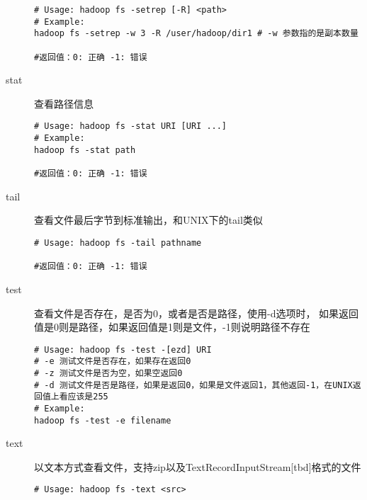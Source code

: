 \documentclass{article}
\begin{document}
\begin{description}
\begin{verbatim}
# Usage: hadoop fs -setrep [-R] <path>
# Example:
hadoop fs -setrep -w 3 -R /user/hadoop/dir1 # -w 参数指的是副本数量

#返回值：0: 正确 -1: 错误
\end{verbatim}

\item[stat] 查看路径信息

\begin{verbatim}
# Usage: hadoop fs -stat URI [URI ...]
# Example:
hadoop fs -stat path

#返回值：0: 正确 -1: 错误
\end{verbatim}

\item[tail] 查看文件最后字节到标准输出，和UNIX下的tail类似

\begin{verbatim}
# Usage: hadoop fs -tail pathname

#返回值：0: 正确 -1: 错误
\end{verbatim}

\item[test] 查看文件是否存在，是否为0，或者是否是路径，使用-d选项时，
如果返回值是0则是路径，如果返回值是1则是文件，-1则说明路径不存在

\begin{verbatim}
# Usage: hadoop fs -test -[ezd] URI
# -e 测试文件是否存在，如果存在返回0
# -z 测试文件是否为空，如果空返回0
# -d 测试文件是否是路径，如果是返回0，如果是文件返回1，其他返回-1，在UNIX返回值上看应该是255
# Example:
hadoop fs -test -e filename

\end{verbatim}

\item[text] 以文本方式查看文件，支持zip以及TextRecordInputStream[tbd]格式的文件

\begin{verbatim}
# Usage: hadoop fs -text <src>


\end{verbatim}
\end{description}
\end{document}
